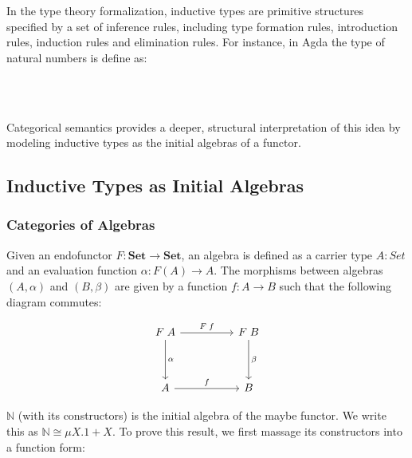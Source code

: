 In the type theory formalization, inductive types are primitive structures specified by a set of inference rules, including type formation rules, introduction rules, induction rules and elimination rules\cite{rijke2022introduction}. For instance, in Agda the type of natural numbers is define as:

\begin{code}%
\>[0]\AgdaSpace{}%
\AgdaSpace{}%
\AgdaSymbol{:}\AgdaSpace{}%
\AgdaSpace{}%
\<%
\\
\>[0][@{}l@{\AgdaIndent{0}}]%
\>[2]\AgdaSpace{}%
\AgdaSymbol{:}\AgdaSpace{}%
\<%
\\
%
\>[2]\AgdaSpace{}%
\AgdaSymbol{:}\AgdaSpace{}%
\AgdaSpace{}%
\AgdaSpace{}%
\<%
\end{code}

Categorical semantics provides a deeper, structural interpretation of this idea by modeling inductive types as the initial algebras of a functor.

\subsection{Inductive Types as Initial Algebras}

\subsubsection*{Categories of Algebras}

Given an endofunctor $F : \textbf{Set} \to \textbf{Set}$, an algebra is defined as a carrier type $A : Set$ and an evaluation function $\alpha : F(A) \to A$. The morphisms between algebras $(A,\alpha)$ and $(B,\beta)$ are given by a function $f : A \to B$ such that the following diagram commutes:

\[
\begin{tikzcd}[row sep=huge, column sep=huge]
  F\;A \arrow[r, "F\;f"] \arrow[d, "\alpha"]
  & F\;B \arrow[d, "\beta"] \\
  A \arrow[r, "f"]
  & B
\end{tikzcd}
\]

$\mathbb{N}$ (with its constructors) is the initial algebra of the maybe functor. We write this as $\mathbb{N} \cong \mu X. 1 + X$. To prove this result, we first massage its constructors into a function form:

